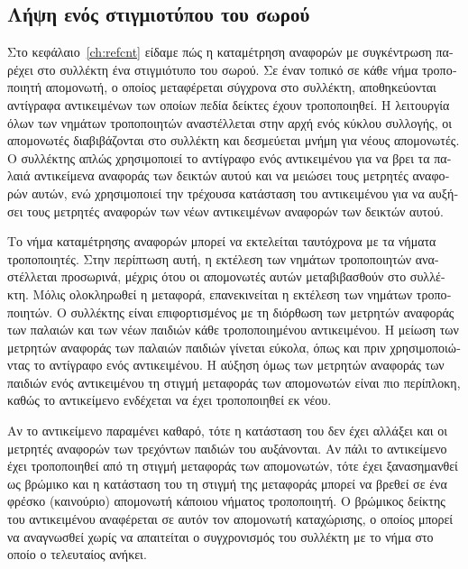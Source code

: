 \begin{greek}
\subsection{Λήψη ενός στιγμιοτύπου του σωρού}
Στο κεφάλαιο~\ref{ch:refcnt} είδαμε πώς η καταμέτρηση
αναφορών με συγκέντρωση παρέχει στο συλλέκτη ένα στιγμιότυπο
του σωρού. Σε έναν τοπικό σε κάθε νήμα τροποποιητή απομονωτή,
ο οποίος μεταφέρεται σύγχρονα στο συλλέκτη, αποθηκεύονται
αντίγραφα αντικειμένων των οποίων πεδία δείκτες έχουν
τροποποιηθεί. Η λειτουργία όλων των νημάτων τροποποιητών
αναστέλλεται στην αρχή ενός κύκλου συλλογής, οι απομονωτές
διαβιβάζονται στο συλλέκτη και δεσμεύεται μνήμη για νέους
απομονωτές. Ο συλλέκτης απλώς χρησιμοποιεί το αντίγραφο ενός
αντικειμένου για να βρει τα παλαιά αντικείμενα αναφοράς των
δεικτών αυτού και να μειώσει τους μετρητές αναφορών αυτών,
ενώ χρησιμοποιεί την τρέχουσα κατάσταση του αντικειμένου για
να αυξήσει τους μετρητές αναφορών των νέων αντικειμένων
αναφορών των δεικτών αυτού. 

Το νήμα καταμέτρησης αναφορών μπορεί να εκτελείται ταυτόχρονα
με τα νήματα τροποποιητές. Στην περίπτωση αυτή, η εκτέλεση
των νημάτων τροποποιητών αναστέλλεται προσωρινά, μέχρις ότου
οι απομονωτές αυτών μεταβιβασθούν στο συλλέκτη. Μόλις
ολοκληρωθεί η μεταφορά, επανεκινείται η εκτέλεση των νημάτων
τροποποιητών. Ο συλλέκτης είναι επιφορτισμένος με τη διόρθωση
των μετρητών αναφοράς των παλαιών και των νέων παιδιών κάθε
τροποποιημένου αντικειμένου. Η μείωση των μετρητών αναφοράς των
παλαιών παιδιών γίνεται εύκολα, όπως και πριν χρησιμοποιώντας
το αντίγραφο ενός αντικειμένου. Η αύξηση όμως των μετρητών
αναφοράς των παιδιών ενός αντικειμένου τη στιγμή μεταφοράς των
απομονωτών είναι πιο περίπλοκη, καθώς το αντικείμενο ενδέχεται
να έχει τροποποιηθεί εκ νέου.

Αν το αντικείμενο παραμένει καθαρό, τότε η κατάσταση του δεν
έχει αλλάξει και οι μετρητές αναφορών των τρεχόντων παιδιών
του αυξάνονται. Αν πάλι το αντικείμενο έχει τροποποιηθεί από
τη στιγμή μεταφοράς των απομονωτών, τότε έχει ξανασημανθεί ως
βρώμικο και η κατάσταση του τη στιγμή της μεταφοράς μπορεί να
βρεθεί σε ένα φρέσκο (καινούριο) απομονωτή κάποιου νήματος
τροποποιητή. Ο βρώμικος δείκτης του αντικειμένου αναφέρεται
σε αυτόν τον απομονωτή καταχώρισης, ο οποίος μπορεί να
αναγνωσθεί χωρίς να απαιτείται ο συγχρονισμός του συλλέκτη
με το νήμα στο οποίο ο τελευταίος ανήκει.


\end{greek}
